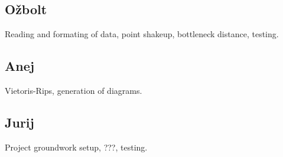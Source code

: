 \documentclass[11pt]{article}
\begin{document}

\subsection{Ožbolt}
Reading and formating of data, point shakeup, bottleneck distance, testing.

\subsection{Anej}
Vietoris-Rips, generation of diagrams.

\subsection{Jurij}
Project groundwork setup, ???, testing. %

\newpage



\end{document}
